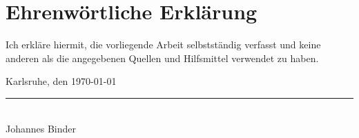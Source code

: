 \chapter*{Ehrenwörtliche Erklärung}
\thispagestyle{empty}

\vspace*{4cm}




Ich erkläre hiermit, die vorliegende Arbeit selbstständig verfasst und keine anderen als die angegebenen Quellen und Hilfsmittel verwendet zu haben.

\bigskip
\bigskip
\bigskip

Karlsruhe, den \today

\bigskip
\bigskip
\bigskip

\rule{0.3\textwidth}{0.4pt}\\
Johannes Binder